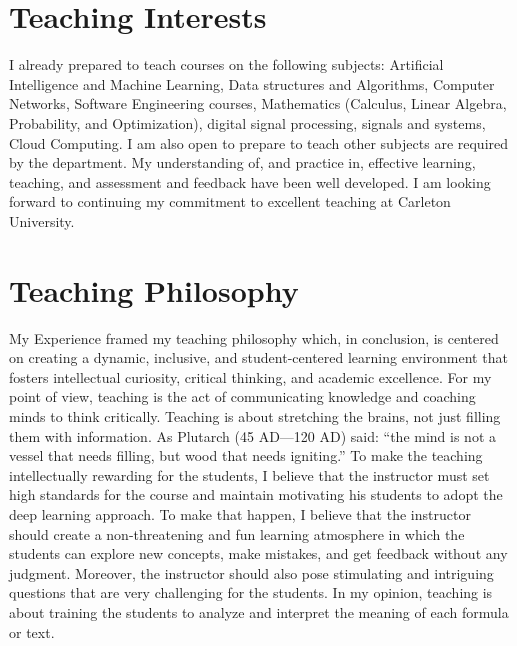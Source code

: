 \documentclass[11pt]{article}
\begin{document}
   

\section{Teaching Interests}


I already prepared to teach courses on the following subjects: Artificial Intelligence and Machine Learning, Data structures and Algorithms, Computer Networks,  Software Engineering courses, Mathematics (Calculus, Linear Algebra, Probability, and Optimization), digital signal processing, signals and systems, Cloud Computing.  I am also open to prepare to teach other subjects are required by the department.
My understanding of, and practice in, effective learning, teaching, and assessment and feedback have been well developed. I am looking forward to continuing my commitment to excellent teaching at Carleton University. 


\section{Teaching Philosophy}
My Experience framed my  teaching philosophy which, in conclusion, is centered on creating a dynamic, inclusive, and student-centered learning environment that fosters intellectual curiosity, critical thinking, and academic excellence. 
For my point of view, teaching is the act of communicating knowledge and coaching minds to think critically. Teaching is about stretching the brains, not just filling them with information. As Plutarch (45 AD---120 AD) said: ``the mind is not a vessel that needs filling, but wood that needs igniting.'' To make the teaching intellectually rewarding for the students, I believe that the instructor must set high standards for the course and maintain motivating his students to adopt the deep learning approach. To make that happen, I believe that the instructor should create a non-threatening and fun learning atmosphere in which the students can explore new concepts, make mistakes, and get feedback without any judgment. Moreover, the instructor should also pose stimulating and intriguing questions that are very challenging for the students. In my opinion, teaching is about training the students to analyze and interpret the meaning of each formula or text. 
\end{document}
